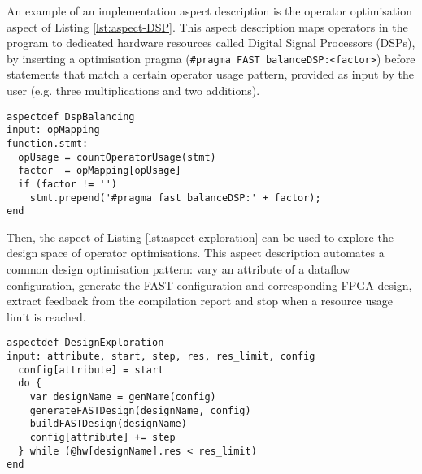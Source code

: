 An example of an implementation aspect description is the operator
optimisation aspect of Listing \ref{lst:aspect-DSP}. This aspect
description maps operators in the program to dedicated hardware
resources called Digital Signal Processors (DSPs), by inserting a
\FAST{} optimisation pragma (\texttt{\#pragma FAST
  balanceDSP:<factor>}) before statements that match a certain
operator usage pattern, provided as input by the user (e.g. three
multiplications and two additions).

\begin{lstlisting}[label=lst:aspect-DSP, style=lara,
  caption={Operator optimisation aspect.}]
aspectdef DspBalancing
input: opMapping
function.stmt:
  opUsage = countOperatorUsage(stmt)
  factor  = opMapping[opUsage]
  if (factor != '')
    stmt.prepend('#pragma fast balanceDSP:' + factor);
end
\end{lstlisting}

Then, the aspect of Listing \ref{lst:aspect-exploration} can be used
to explore the design space of operator optimisations. This aspect
description automates a common design optimisation pattern: vary an
attribute of a dataflow configuration, generate the FAST configuration
and corresponding FPGA design, extract feedback from the compilation
report and stop when a resource usage limit is reached.

\begin{lstlisting}[label=lst:aspect-exploration, style=lara,
  caption={Iterative design space exploration aspect.}]
aspectdef DesignExploration
input: attribute, start, step, res, res_limit, config
  config[attribute] = start
  do {
    var designName = genName(config)
    generateFASTDesign(designName, config)
    buildFASTDesign(designName)
    config[attribute] += step
  } while (@hw[designName].res < res_limit)
end
\end{lstlisting}

